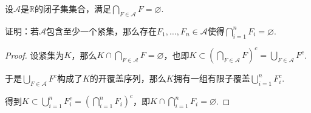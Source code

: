 \begin{problem}[5]\label{2.A.5}
    设\(\mathcal{A}\)是\(\mathbb{R}\)的闭子集集合，满足\(\bigcap_{F \in \mathcal{A}}F=\varnothing\).

    证明：若\(\mathcal{A}\)包含至少一个紧集，那么存在\(F_1, \dots, F_n \in \mathcal{A}\)使得\(\bigcap_{i=1}^n F_i=\varnothing\).
\end{problem}

\begin{proof}
    设紧集为\(K\)，那么\(K \cap \bigcap_{F \in \mathcal{A}}F=\varnothing\)，也即\(K \subset (\bigcap_{F \in \mathcal{A}}F)^c=\bigcup_{F \in \mathcal{A}}F^c\).

    于是\(\bigcup_{F \in \mathcal{A}}F^c\)构成了\(K\)的开覆盖序列，那么\(K\)拥有一组有限子覆盖\(\bigcup_{i=1}^n F_i^c\).

    得到\(K \subset \bigcup_{i=1}^n F_i^c=(\bigcap_{i=1}^n F_i)^c\)，即\(K \cap \bigcap_{i=1}^n F_i=\varnothing\).
\end{proof}

\begin{comment}
    \begin{problem}[7]\label{2.A.7}
        证明：若\(I_1, \dots, I_n\)是互不相交的开区间，那么\(\abs*{\bigcup_{k=1}^n I_k}=\sum_{k=1}^n \ell(I_k)\).
    \end{problem}

    \begin{proof}
        对于\(n=1\)，情况显然成立.现设\(\abs*{\bigcup_{k=1}^{n-1} I_k}=\sum_{k=1}^{n-1} \ell(I_k)\).

        设\(I_n=(a_n,b_n)\).若\(\ell(I_n)=\infty\)，那么\(\abs*{\bigcup_{k=1}^n I_k}=\sum_{k=1}^n \ell(I_k)=\infty\)，故设\(\ell(I_n)<\infty\).

        由于\(\bigcup_{k=1}^n I_k=\bigcup_{k=1}^{n-1} I_k \cup I_n\)，故\(\abs*{\bigcup_{k=1}^n I_k} \leq \abs*{\bigcup_{k=1}^{n-1} I_k}+\ell(I_n)=\sum_{k=1}^n \ell(I_k)\).

        设\(\bigcup_{k=1}^n I_k\)的开覆盖为\(\bigcup_{i=1}^\infty G_i\).令\(G_i^1=G_i \cap (-\infty,a_n), G_i^2=G_i \cap (a_n,b_n), G_i^3=G_i \cap (b_n,\infty)\).

        所以\(G_1^1, G_1^3, G_2^1, G_2^3, \dots\)和\(G_1^2, G_2^2, \dots\)分别是\(\bigcup_{k=1}^{n-1} I_k\)和\(I_n\)的开覆盖序列.
        \begin{align*}
            \sum_{i=1}^\infty \ell(G_i)=\sum_{i=1}^\infty (\ell(G_i^1)+\ell(G_i^3))+\sum_{i=1}^\infty \ell(G_i^2)
            \geq \abs*{\bigcup_{k=1}^{n-1} I_k}+\abs*{I_n}
        \end{align*}
        取下确界得\(\sum_{k=1}^n \ell(I_k) \geq \abs*{\bigcup_{k=1}^{n-1} I_k}+\ell(I_n)\)，即\(\abs*{\bigcup_{k=1}^n I_k}=\sum_{k=1}^n \ell(I_k)\).
    \end{proof}
\end{comment}


